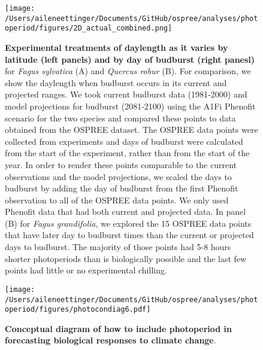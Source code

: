 \documentclass{article}
\begin{document}
 
 
\begin{figure}[p]
\texttt{[image: /Users/aileneettinger/Documents/GitHub/ospree/analyses/photoperiod/figures/2D\_actual\_combined.png]} 
\caption{\textbf{Experimental treatments of daylength as it varies by latitude (left panels) and by day of budburst (right panesl)} for \textit{Fagus sylvatica} (A) and \textit{Quercus robur} (B). For comparison, we show the daylength when budburst occurs in its current and projected ranges. We took current budburst data (1981-2000) and model projections for budburst (2081-2100) using the A1Fi Phenofit scenario \citep{duputie2015} for the two species and compared these points to data obtained from the OSPREE dataset. The OSPREE data points were collected from experiments and days of budburst were calculated from the start of the experiment, rather than from the start of the year. In order to render these points comparable to the current observations and the model projections, we scaled the days to budburst by adding the day of budburst from the first Phenofit observation to all of the OSPREE data points. We only used Phenofit data that had both current and projected data. In panel (B) for \textit{Fagus grandifolia}, we explored the 15 OSPREE data points that have later day to budburst times than the current or projected days to budburst. The majority of those points had 5-8 hours shorter photoperiods than is biologically possible and the last few points had little or no experimental chilling.}%
 \label{fig:fagus}
 \end{figure}
 
\begin{figure}[p]
\texttt{[image: /Users/aileneettinger/Documents/GitHub/ospree/analyses/photoperiod/figures/photocondiag6.pdf]} 
\caption{\textbf{Conceptual diagram of how to include photoperiod in forecasting biological responses to climate change}.}
 \label{fig:condiag}
 \end{figure}
 
\end{document}
